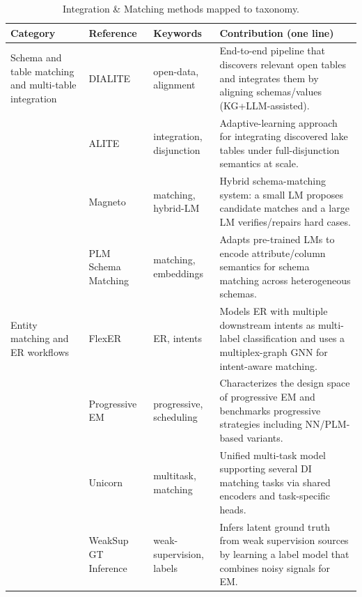 \documentclass[sigconf]{acmart}
\newcommand{\tbl}{%
  \scriptsize
  \setlength{\tabcolsep}{4pt}%
  \renewcommand{\arraystretch}{1.12}%
}
\begin{document}
\begin{table}[!htbp]
\caption{Integration \& Matching methods mapped to taxonomy.}
\label{tab:integration-methods}
\tbl
\begin{tabularx}{\textwidth}{@{}p{24mm}p{28mm}p{18mm}Y@{}}
\toprule
\textbf{Category} & \textbf{Reference} & \textbf{Keywords} & \textbf{Contribution (one line)} \\
\midrule

Schema and table matching and multi-table integration &
DIALITE~\cite{10.1145/3555041.3589732} &
open-data, alignment &
End-to-end pipeline that discovers relevant open tables and integrates them by aligning schemas/values (KG+LLM-assisted). \\

~ &
ALITE~\cite{10.14778/3574245.3574274} &
integration, disjunction &
Adaptive-learning approach for integrating discovered lake tables under full-disjunction semantics at scale. \\

~ &
Magneto~\cite{10.14778/3742728.3742757} &
matching, hybrid-LM &
Hybrid schema-matching system: a small LM proposes candidate matches and a large LM verifies/repairs hard cases. \\

~ &
PLM Schema Matching~\cite{10184612} &
matching, embeddings &
Adapts pre-trained LMs to encode attribute/column semantics for schema matching across heterogeneous schemas. \\

\midrule

Entity matching and ER workflows &
FlexER~\cite{10.1145/3588722} &
ER, intents &
Models ER with multiple downstream intents as multi-label classification and uses a multiplex-graph GNN for intent-aware matching. \\

~ &
Progressive EM~\cite{10.1145/3709715} &
progressive, scheduling &
Characterizes the design space of progressive EM and benchmarks progressive strategies including NN/PLM-based variants. \\

~ &
Unicorn~\cite{10.1145/3588938} &
multitask, matching &
Unified multi-task model supporting several DI matching tasks via shared encoders and task-specific heads. \\

~ &
WeakSup GT Inference~\cite{10.1145/3588712} &
weak-supervision, labels &
Infers latent ground truth from weak supervision sources by learning a label model that combines noisy signals for EM. \\


\end{tabularx}
\end{table}
\end{document}
